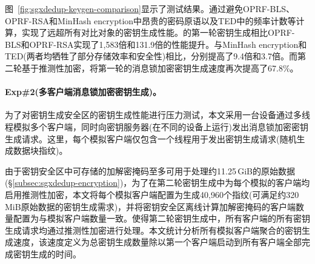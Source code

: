 图~\ref{fig:sgxdedup-keygen-comparison}显示了测试结果。\sysnameS 通过避免OPRF-BLS、OPRF-RSA和MinHash encryption中昂贵的密码原语以及TED中的频率计数等计算，实现了远超所有对比对象的密钥生成性能。\sysnameS 的第一轮密钥生成相比OPRF-BLS和OPRF-RSA实现了1,583倍和131.9倍的性能提升。与MinHash encryption和TED(两者均牺牲了部分存储效率和安全性)相比，分别提高了9.4倍和3.7倍。而第二轮基于推测性加密，\sysnameS 将第一轮的消息锁加密密钥生成速度再次提高了67.8\%。

\paragraph*{Exp\#2(多客户端消息锁加密密钥生成)。}为了对密钥生成安全区的密钥生成性能进行压力测试，本文采用一台设备通过多线程模拟多个客户端，同时向密钥服务器(在不同的设备上运行)发出消息锁加密密钥生成请求。这里，每个模拟客户端仅包含一个线程用于发出密钥生成请求(随机生成数据块指纹)。

由于密钥安全区中可存储的加解密掩码至多可用于处理约11.25\,GiB的原始数据(\S\ref{subsec:sgxdedup-encryption})，为了在第二轮密钥生成中为每个模拟的客户端均启用推测性加密，本文将每个模拟客户端配置为生成40,960个指纹(可满足约320\,MiB原始数据的密钥生成需求)，并将密钥安全区离线计算加解密掩码的客户端数量配置为与模拟客户端数量一致。使得第二轮密钥生成中，所有客户端的所有密钥生成请求均通过推测性加密进行处理。本文统计分析所有模拟客户端聚合的密钥生成速度，该速度定义为总密钥生成数量除以第一个客户端启动到所有客户端全部完成密钥生成的时间。

